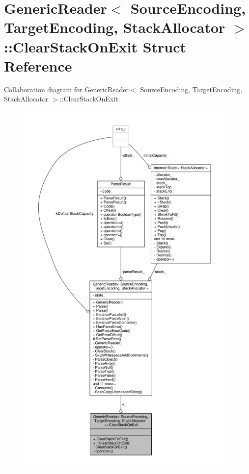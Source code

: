\hypertarget{structGenericReader_1_1ClearStackOnExit}{}\section{Generic\+Reader$<$ Source\+Encoding, Target\+Encoding, Stack\+Allocator $>$\+:\+:Clear\+Stack\+On\+Exit Struct Reference}
\label{structGenericReader_1_1ClearStackOnExit}


Collaboration diagram for Generic\+Reader$<$ Source\+Encoding, Target\+Encoding, Stack\+Allocator $>$\+:\+:Clear\+Stack\+On\+Exit\+:
\nopagebreak
\begin{figure}[H]
\begin{center}
\leavevmode
\includegraphics[height=550pt]{structGenericReader_1_1ClearStackOnExit__coll__graph}
\end{center}
\end{figure}
